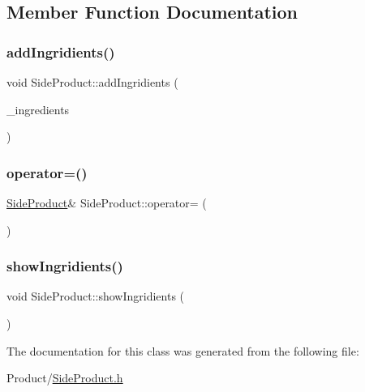 \subsection{Member Function Documentation}
\mbox{\label{classSideProduct_af2636d33dc1ef69665c34254d64a676b}} 
\subsubsection{\texorpdfstring{addIngridients()}{addIngridients()}}
{\footnotesize\ttfamily void Side\+Product\+::add\+Ingridients (\begin{DoxyParamCaption}\item[{\mbox{\hyperlink{classFarmProduct}{Farm\+Product}}}]{\+\_\+ingredients }\end{DoxyParamCaption})}

\mbox{\label{classSideProduct_aaa352e295cececc88e51656786435089}} 
\subsubsection{\texorpdfstring{operator=()}{operator=()}}
{\footnotesize\ttfamily \mbox{\hyperlink{classSideProduct}{Side\+Product}}\& Side\+Product\+::operator= (\begin{DoxyParamCaption}\item[{const \mbox{\hyperlink{classSideProduct}{Side\+Product}} \&}]{ }\end{DoxyParamCaption})}

\mbox{\label{classSideProduct_ad192ac2e64326fc728635ecf6ac1e45a}} 
\subsubsection{\texorpdfstring{showIngridients()}{showIngridients()}}
{\footnotesize\ttfamily void Side\+Product\+::show\+Ingridients (\begin{DoxyParamCaption}{ }\end{DoxyParamCaption})}



The documentation for this class was generated from the following file\+:\begin{DoxyCompactItemize}
\item 
Product/\mbox{\hyperlink{SideProduct_8h}{Side\+Product.\+h}}\end{DoxyCompactItemize}
